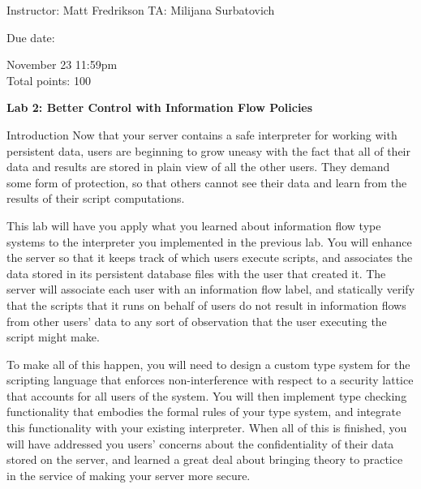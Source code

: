 \documentclass[11pt]{article}
\newcommand*{\stuname}{}
\newcommand*{\assignmentnumb}{2}
\begin{document}
\centerline{Instructor: Matt Fredrikson \hfill TA: Milijana Surbatovich} 
Due date: {November 23 11:59pm \\
Total points: 100 \\[1.5em]
\vspace{1.5ex}
\centerline{\Large\bf Lab \assignmentnumb: Better Control with Information Flow Policies}
\vspace{0.5ex}
\centerline{\Large\bf \stuname}

\begin{problem}{Introduction}
Now that your server contains a safe interpreter for working with persistent data, users are beginning to grow 
uneasy with the fact that all of their data and results are stored in plain view of all the other users. They 
demand some form of protection, so that others cannot see their data and learn from the results of their script computations.

This lab will have you apply what you learned about information flow type systems to the interpreter you implemented 
in the previous lab. You will enhance the server so that it keeps track of which users execute scripts, and associates
 the data stored in its persistent database files with the user that created it. The server will associate each user 
 with an information flow label, and statically verify that the scripts that it runs on behalf of users do not result 
 in information flows from other users' data to any sort of observation that the user executing the script might make.

To make all of this happen, you will need to design a custom type system for the scripting language that enforces 
non-interference with respect to a security lattice that accounts for all users of the system. You will then implement 
type checking functionality that embodies the formal rules of your type system, and integrate this functionality with 
your existing interpreter. When all of this is finished, you will have addressed you users' concerns about the 
confidentiality of their data stored on the server, and learned a great deal about bringing theory to practice 
in the service of making your server more secure.
  

\end{problem}}
\end{document}
